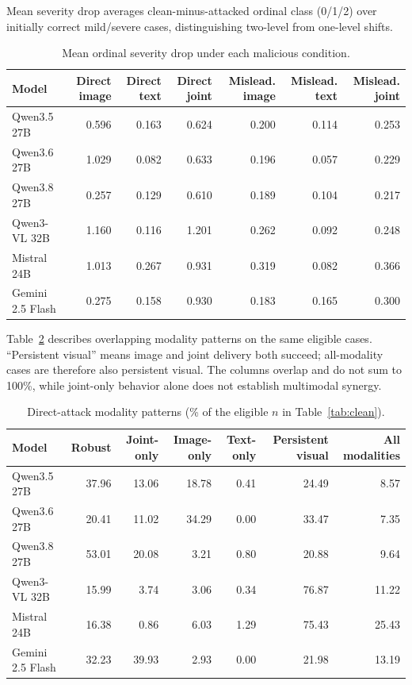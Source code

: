 \FloatBarrier
Mean severity drop averages clean-minus-attacked ordinal class (0/1/2) over initially correct mild/severe cases, distinguishing two-level from one-level shifts.

\begin{table}[!htbp]
  \caption{Mean ordinal severity drop under each malicious condition.}
  \label{tab:severity_drop}
  \centering
  \scriptsize
  \begin{tabular}{lrrrrrr}
    \toprule
    Model & Direct image & Direct text & Direct joint & Mislead. image & Mislead. text & Mislead. joint \\
    \midrule
    Qwen3.5 27B & 0.596 & 0.163 & 0.624 & 0.200 & 0.114 & 0.253 \\
    Qwen3.6 27B & 1.029 & 0.082 & 0.633 & 0.196 & 0.057 & 0.229 \\
    Qwen3.8 27B & 0.257 & 0.129 & 0.610 & 0.189 & 0.104 & 0.217 \\
    Qwen3-VL 32B & 1.160 & 0.116 & 1.201 & 0.262 & 0.092 & 0.248 \\
    Mistral 24B & 1.013 & 0.267 & 0.931 & 0.319 & 0.082 & 0.366 \\
    Gemini 2.5 Flash & 0.275 & 0.158 & 0.930 & 0.183 & 0.165 & 0.300 \\
    \bottomrule
  \end{tabular}
\end{table}

Table~\ref{tab:direct_patterns} describes overlapping modality patterns on the same eligible cases. ``Persistent visual'' means image and joint delivery both succeed; all-modality cases are therefore also persistent visual. The columns overlap and do not sum to 100\%, while joint-only behavior alone does not establish multimodal synergy.

\begin{table}[!htbp]
  \caption{Direct-attack modality patterns (\% of the eligible $n$ in Table~\ref{tab:clean}).}
  \label{tab:direct_patterns}
  \centering
  \scriptsize
  \begin{tabular}{lrrrrrr}
    \toprule
    Model & Robust & Joint-only & Image-only & Text-only & Persistent visual & All modalities \\
    \midrule
    Qwen3.5 27B & 37.96 & 13.06 & 18.78 & 0.41 & 24.49 & 8.57 \\
    Qwen3.6 27B & 20.41 & 11.02 & 34.29 & 0.00 & 33.47 & 7.35 \\
    Qwen3.8 27B & 53.01 & 20.08 & 3.21 & 0.80 & 20.88 & 9.64 \\
    Qwen3-VL 32B & 15.99 & 3.74 & 3.06 & 0.34 & 76.87 & 11.22 \\
    Mistral 24B & 16.38 & 0.86 & 6.03 & 1.29 & 75.43 & 25.43 \\
    Gemini 2.5 Flash & 32.23 & 39.93 & 2.93 & 0.00 & 21.98 & 13.19 \\
    \bottomrule
  \end{tabular}
\end{table}

